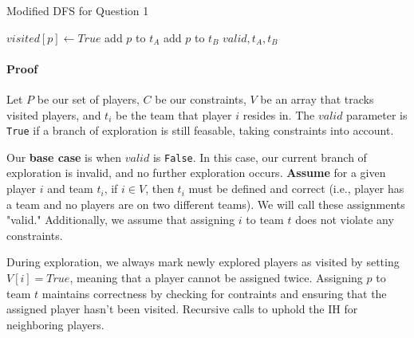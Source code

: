 \documentclass[11pt]{article}
\begin{document}
\begin{algorithm}
\caption{Modified DFS for Question 1}
\begin{algorithmic}[1]
        \State \Return 
    \EndIf
    \State $visited[p] \leftarrow True$
        \State add $p$ to $t_{A}$
        \State add $p$ to $t_{B}$
    \EndIf
                \State {}
                \State {}
            \EndIf
            \State {}
        \EndIf
                \State \Return $valid, t_{A}, t_{B}$
            \EndIf
        \EndIf
    \EndFor
\EndProcedure 
\end{algorithmic}
\end{algorithm}

\pagebreak

\paragraph{Proof}
Let $P$ be our set of players, $C$ be our constraints, $V$ be an array that
tracks visited players, and $t_{i}$ be the team that player $i$ resides in. The
$valid$ parameter is \texttt{True} if a branch of exploration is still feasable,
taking constraints into account.

Our \textbf{base case} is when $valid$ is \texttt{False}. In this case, our
current branch of exploration is invalid, and no further exploration occurs.
\textbf{Assume} for a given player $i$ and team $t_{i}$, if $i \in V$, then
$t_{i}$ must be defined and correct (i.e., player has a team and no players
are on two different teams). We will call these assignments "valid."
Additionally, we assume that assigning $i$ to team $t$ does not violate any 
constraints.

During exploration, we always mark newly explored players as visited by setting
$V[i] = True$, meaning that a player cannot be assigned twice. Assigning $p$ to
team $t$ maintains correctness by checking for contraints and ensuring that
the assigned player hasn't been visited. Recursive calls to 
uphold the IH for neighboring players.
\end{document}
